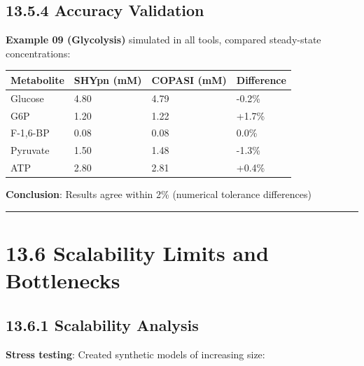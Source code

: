 \hypertarget{accuracy-validation}{%
\subsection{13.5.4 Accuracy Validation}\label{accuracy-validation}}

\textbf{Example 09 (Glycolysis)} simulated in all tools, compared
steady-state concentrations:

\begin{longtable}[]{@{}llll@{}}
\toprule\noalign{}
Metabolite & SHYpn (mM) & COPASI (mM) & Difference \\
\midrule\noalign{}
\endhead
\bottomrule\noalign{}
\endlastfoot
Glucose & 4.80 & 4.79 & -0.2\% \\
G6P & 1.20 & 1.22 & +1.7\% \\
F-1,6-BP & 0.08 & 0.08 & 0.0\% \\
Pyruvate & 1.50 & 1.48 & -1.3\% \\
ATP & 2.80 & 2.81 & +0.4\% \\
\end{longtable}

\textbf{Conclusion}: Results agree within 2\% (numerical tolerance
differences) \checkmark

\begin{center}\rule{0.5\linewidth}{0.5pt}\end{center}

\hypertarget{scalability-limits-and-bottlenecks}{%
\section{13.6 Scalability Limits and
Bottlenecks}\label{scalability-limits-and-bottlenecks}}

\hypertarget{scalability-analysis}{%
\subsection{13.6.1 Scalability Analysis}\label{scalability-analysis}}

\textbf{Stress testing}: Created synthetic models of increasing size:

